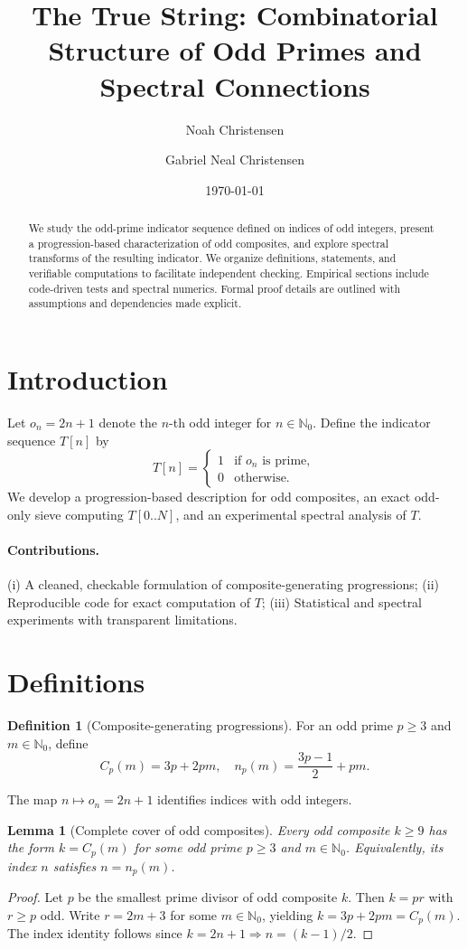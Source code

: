 \documentclass[11pt]{article}
\title{The True String: Combinatorial Structure of Odd Primes and Spectral Connections}
\author{Noah Christensen \and Gabriel Neal Christensen}
\date{\today}
\newtheorem{lemma}{Lemma}
\theoremstyle{definition}
\newtheorem{definition}{Definition}
\theoremstyle{remark}
\begin{document}
\maketitle
\tableofcontents

\begin{abstract}
We study the odd-prime indicator sequence defined on indices of odd integers, present a progression-based characterization of odd composites, and explore spectral transforms of the resulting indicator. We organize definitions, statements, and verifiable computations to facilitate independent checking. Empirical sections include code-driven tests and spectral numerics. Formal proof details are outlined with assumptions and dependencies made explicit.
\end{abstract}

\section{Introduction}
Let \(o_n = 2n+1\) denote the \(n\)-th odd integer for \(n \in \mathbb{N}_0\). Define the indicator sequence \(T[n]\) by
\[
T[n] = \begin{cases}1 & \text{if } o_n \text{ is prime},\\ 0 & \text{otherwise.}\end{cases}
\]
We develop a progression-based description for odd composites, an exact odd-only sieve computing \(T[0..N]\), and an experimental spectral analysis of \(T\).

\paragraph{Contributions.} (i) A cleaned, checkable formulation of composite-generating progressions; (ii) Reproducible code for exact computation of \(T\); (iii) Statistical and spectral experiments with transparent limitations.

\section{Definitions}
\begin{definition}[Composite-generating progressions]
For an odd prime \(p\ge 3\) and \(m\in\mathbb{N}_0\), define
\[
 C_p(m) = 3p + 2pm, \quad n_p(m) = \frac{3p-1}{2} + pm.
\]
\end{definition}
The map \(n \mapsto o_n=2n+1\) identifies indices with odd integers.

\begin{lemma}[Complete cover of odd composites]\label{lem:cover}
Every odd composite \(k\ge 9\) has the form \(k = C_p(m)\) for some odd prime \(p\ge 3\) and \(m\in\mathbb{N}_0\). Equivalently, its index \(n\) satisfies \(n = n_p(m)\).
\end{lemma}
\begin{proof}
Let \(p\) be the smallest prime divisor of odd composite \(k\). Then \(k=pr\) with \(r\ge p\) odd. Write \(r=2m+3\) for some \(m\in\mathbb{N}_0\), yielding \(k=3p+2pm=C_p(m)\). The index identity follows since \(k=2n+1\Rightarrow n=(k-1)/2\).
\end{proof}
\end{document}
